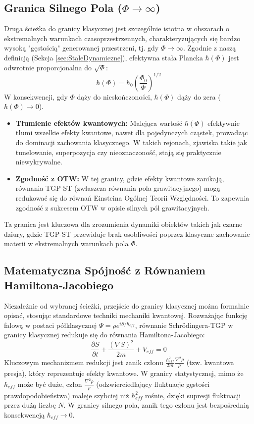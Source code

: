 \documentclass[11pt,a4paper]{article}
\begin{document}
\subsection{Granica Silnego Pola ($\Phi \rightarrow \infty$)}
Druga ścieżka do granicy klasycznej jest szczególnie istotna w obszarach o ekstremalnych warunkach czasoprzestrzennych, charakteryzujących się bardzo wysoką "gęstością" generowanej przestrzeni, tj. gdy $\Phi \rightarrow \infty$. Zgodnie z naszą definicją (Sekcja \ref{sec:StaleDynamiczne}), efektywna stała Plancka $\hbar(\Phi)$ jest odwrotnie proporcjonalna do $\sqrt{\Phi}$:
\begin{equation}
    \hbar(\Phi) = \hbar_0 \left(\frac{\Phi_0}{\Phi}\right)^{1/2}
\end{equation}
W konsekwencji, gdy $\Phi$ dąży do nieskończoności, $\hbar(\Phi)$ dąży do zera ($\hbar(\Phi) \rightarrow 0$).
\begin{itemize}
    \item \textbf{Tłumienie efektów kwantowych:} Malejąca wartość $\hbar(\Phi)$ efektywnie tłumi wszelkie efekty kwantowe, nawet dla pojedynczych cząstek, prowadząc do dominacji zachowania klasycznego. W takich rejonach, zjawiska takie jak tunelowanie, superpozycja czy nieoznaczoność, stają się praktycznie niewykrywalne.
    \item \textbf{Zgodność z OTW:} W tej granicy, gdzie efekty kwantowe zanikają, równania TGP-ST (zwłaszcza równania pola grawitacyjnego) mogą redukować się do równań Einsteina Ogólnej Teorii Względności. To zapewnia zgodność z sukcesem OTW w opisie silnych pól grawitacyjnych.
\end{itemize}
Ta granica jest kluczowa dla zrozumienia dynamiki obiektów takich jak czarne dziury, gdzie TGP-ST przewiduje brak osobliwości poprzez klasyczne zachowanie materii w ekstremalnych warunkach pola $\Phi$.

\subsection{Matematyczna Spójność z Równaniem Hamiltona-Jacobiego}
Niezależnie od wybranej ścieżki, przejście do granicy klasycznej można formalnie opisać, stosując standardowe techniki mechaniki kwantowej. Rozważając funkcję falową w postaci półklasycznej $\Psi = \rho e^{iS/\hbar_{eff}}$, równanie Schrödingera-TGP w granicy klasycznej redukuje się do równania Hamiltona-Jacobiego:
\begin{equation}
    \frac{\partial S}{\partial t} + \frac{(\nabla S)^2}{2m} + V_{eff} = 0
\end{equation}
Kluczowym mechanizmem redukcji jest zanik członu $\frac{\hbar_{eff}^2}{2m}\frac{\nabla^2\rho}{\rho}$ (tzw. kwantowa presja), który reprezentuje efekty kwantowe. W granicy statystycznej, mimo że $\hbar_{eff}$ może być duże, człon $\frac{\nabla^2\rho}{\rho}$ (odzwierciedlający fluktuacje gęstości prawdopodobieństwa) maleje szybciej niż $\hbar_{eff}^2$ rośnie, dzięki supresji fluktuacji przez dużą liczbę $N$. W granicy silnego pola, zanik tego członu jest bezpośrednią konsekwencją $\hbar_{eff} \rightarrow 0$.
\end{document}
